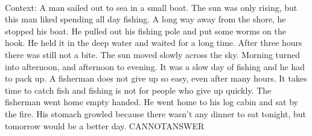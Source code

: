 \documentclass[11pt,a4paper, onecolumn]{article}
\begin{document}
\\ Context: A man sailed out to sea in a small boat. The sun was only rising, but this man liked spending all day fishing. A long way away from the shore, he stopped his boat. He pulled out his fishing pole and put some worms on the hook. He held it in the deep water and waited for a long time. After three hours there was still not a bite. The sun moved slowly across the sky. Morning turned into afternoon, and afternoon to evening. It was a slow day of fishing and he had to pack up. A fisherman does not give up so easy, even after many hours. It takes time to catch fish and fishing is not for people who give up quickly. The fisherman went home empty handed. He went home to his log cabin and sat by the fire. His stomach growled because there wasn't any dinner to eat tonight, but tomorrow would be a better day. CANNOTANSWER
\end{document}
